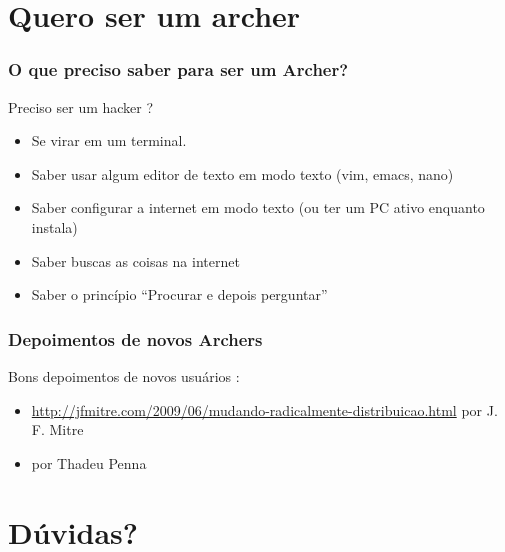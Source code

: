 \documentclass{beamer}
\begin{document}
\section{Quero ser um archer }
    
\begin{frame}
    \frametitle{O que preciso saber para ser um Archer?}
    \begin{block}{Preciso ser um hacker ?}
        \begin{itemize}
            \item<1-> Se virar em um terminal. 
            \item<2-> Saber usar algum editor de texto em modo texto (vim, emacs, nano) 
            \item<3-> Saber configurar a internet em modo texto (ou ter um PC ativo enquanto instala)
            \item<4-> Saber buscas as coisas na internet
            \item<5-> Saber o princípio ``Procurar e depois perguntar''
        \end{itemize}
    \end{block}
\end{frame}

\begin{frame}
        \frametitle{Depoimentos de novos Archers}
        \begin{block}{Bons depoimentos de novos usuários :}
            \begin{itemize}
                \item \url{http://jfmitre.com/2009/06/mudando-radicalmente-distribuicao.html} por J. F. Mitre
                \item por Thadeu Penna
            \end{itemize}
        \end{block}
\end{frame}


\section{Dúvidas?}
\end{document}

